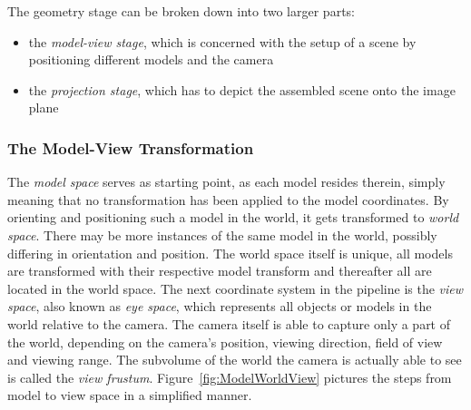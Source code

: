 The geometry stage can be broken down into two larger parts:
\begin{itemize}
 \item the \textit{model-view stage}, which is concerned with the setup of a
scene by positioning different models and the camera
 \item the \textit{projection stage}, which has to depict the assembled scene
onto the image plane
\end{itemize}

\subsubsection{The Model-View Transformation}

The \textit{model space} serves as starting point, as each model resides
therein, simply meaning that no transformation has been applied to the model
coordinates. By orienting and positioning such a model in the world, it gets
transformed to \textit{world space}. There may be more instances of the same
model in the world, possibly differing in orientation and position. The world
space itself is unique, all models are transformed with their respective model
transform and thereafter all are located in the world space. The next
coordinate system in the pipeline is the \textit{view space}, also known as
\textit{eye space}, which represents all objects or models in the world relative
to the camera. The camera itself is able to capture only a part of the world,
depending on the camera's position, viewing direction, field of view and viewing
range. The subvolume of the world the camera is actually able to see is called
the \textit{view frustum}. Figure~\ref{fig:ModelWorldView} pictures the
steps from model to view space in a simplified manner.
